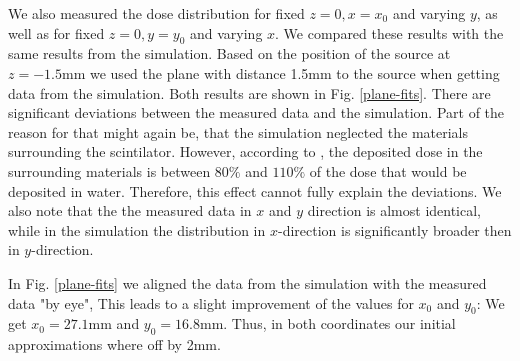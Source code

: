 \documentclass[a4paper,parskip]{scrartcl}
\begin{document}
We also measured the dose distribution for fixed $z=0, x=x_0$ and varying $y$, as well as for fixed $z=0, y=y_0$ and varying $x$. We compared these results with the same results from the simulation. Based on the position of the source at $z=-1.5 \mathrm{mm}$ we used the plane with distance 1.5mm to the source when getting data from the simulation.  Both results are shown in Fig. \ref{plane-fits}. There are significant deviations between the measured data and the simulation. Part of the reason for that might again be, that the simulation neglected the materials surrounding the scintilator. However, according to \cite{Ref:2}, the deposited dose in the surrounding materials is between 80$\%$ and $110\%$ of the dose that would be deposited in water. Therefore, this effect cannot fully explain the deviations. We also note that the the measured data in $x$ and $y$ direction is almost identical, while in the simulation the distribution in $x$-direction is significantly broader then in $y$-direction.

In Fig. \ref{plane-fits} we aligned the data from the simulation with the measured data "by eye", This leads to a slight improvement of the values for $x_0$ and $y_0$: We get $x_0=27.1 \mathrm{mm}$ and $y_0 = 16.8 \mathrm{mm}$. Thus, in both coordinates our initial approximations where off by 2mm.
\end{document}
